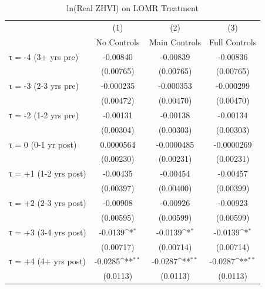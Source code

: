 \begin{table}[htbp]\centering
\def\sym#1{\ifmmode^{#1}\else\(^{#1}\)\fi}
\caption{ln(Real ZHVI) on LOMR Treatment}
\label{tab:main_regression}
\begin{tabular}{l*{3}{c}}
\hline\hline
                    &\multicolumn{1}{c}{(1)}&\multicolumn{1}{c}{(2)}&\multicolumn{1}{c}{(3)}\\
                    &\multicolumn{1}{c}{No Controls}&\multicolumn{1}{c}{Main Controls}&\multicolumn{1}{c}{Full Controls}\\
\hline
τ = -4 (3+ yrs pre) &    -0.00840         &    -0.00839         &    -0.00836         \\
                    &   (0.00765)         &   (0.00765)         &   (0.00765)         \\
[0.3em]
τ = -3 (2-3 yrs pre)&   -0.000235         &   -0.000353         &   -0.000299         \\
                    &   (0.00472)         &   (0.00470)         &   (0.00470)         \\
[0.3em]
τ = -2 (1-2 yrs pre)&    -0.00131         &    -0.00138         &    -0.00134         \\
                    &   (0.00304)         &   (0.00303)         &   (0.00303)         \\
[0.3em]
τ = 0 (0-1 yr post) &   0.0000564         &  -0.0000485         &  -0.0000269         \\
                    &   (0.00230)         &   (0.00231)         &   (0.00231)         \\
[0.3em]
τ = +1 (1-2 yrs post)&    -0.00435         &    -0.00454         &    -0.00457         \\
                    &   (0.00397)         &   (0.00400)         &   (0.00399)         \\
[0.3em]
τ = +2 (2-3 yrs post)&    -0.00908         &    -0.00926         &    -0.00923         \\
                    &   (0.00595)         &   (0.00599)         &   (0.00599)         \\
[0.3em]
τ = +3 (3-4 yrs post)&     -0.0139\sym{*}  &     -0.0139\sym{*}  &     -0.0139\sym{*}  \\
                    &   (0.00717)         &   (0.00714)         &   (0.00714)         \\
[0.3em]
τ = +4 (4+ yrs post)&     -0.0285\sym{**} &     -0.0287\sym{**} &     -0.0287\sym{**} \\
                    &    (0.0113)         &    (0.0113)         &    (0.0113)         \\

\end{tabular}
\end{table}
